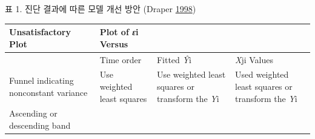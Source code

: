 \documentclass[
  10pt,
]{krantz}
\begin{document}
표 1. 진단 결과에 따른 모델 개선 방안 (Draper \protect\hyperlink{ref-draper1998applied}{1998})

\begin{longtable}[]{@{}llll@{}}
\toprule
\begin{minipage}[b]{0.14\columnwidth}\raggedright
Unsatisfactory Plot\strut
\end{minipage} & \begin{minipage}[b]{0.20\columnwidth}\raggedright
Plot of \emph{ε}i Versus\strut
\end{minipage} & \begin{minipage}[b]{0.27\columnwidth}\raggedright
\strut
\end{minipage} & \begin{minipage}[b]{0.28\columnwidth}\raggedright
\strut
\end{minipage}\tabularnewline
\midrule
\endhead
\begin{minipage}[t]{0.14\columnwidth}\raggedright
\strut
\end{minipage} & \begin{minipage}[t]{0.20\columnwidth}\raggedright
Time order\strut
\end{minipage} & \begin{minipage}[t]{0.27\columnwidth}\raggedright
Fitted \emph{Ŷ}i\strut
\end{minipage} & \begin{minipage}[t]{0.28\columnwidth}\raggedright
\emph{X}ji Values\strut
\end{minipage}\tabularnewline
\begin{minipage}[t]{0.14\columnwidth}\raggedright
Funnel indicating nonconstant variance\strut
\end{minipage} & \begin{minipage}[t]{0.20\columnwidth}\raggedright
Use weighted least squares\strut
\end{minipage} & \begin{minipage}[t]{0.27\columnwidth}\raggedright
Use weighted least squares or transform the \emph{Y}i\strut
\end{minipage} & \begin{minipage}[t]{0.28\columnwidth}\raggedright
Used weighted least squares or transform the \emph{Y}i\strut
\end{minipage}\tabularnewline
\begin{minipage}[t]{0.14\columnwidth}\raggedright
Ascending or descending band\strut
\end{minipage} & \begin{minipage}[t]{0.20\columnwidth}\raggedright

\end{minipage}
\end{longtable}
\end{document}
